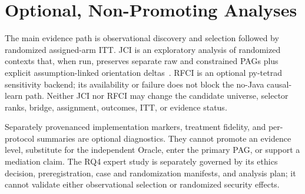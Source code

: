 \section{Optional, Non-Promoting Analyses}

The main evidence path is observational discovery and selection followed by
randomized assigned-arm ITT. JCI is an exploratory analysis of randomized contexts that, when run,
preserves separate raw and constrained PAGs plus explicit assumption-linked
orientation deltas~\cite{mooij2020jci}. RFCI is an optional py-tetrad
sensitivity backend; its availability or failure does not block the no-Java
causal-learn path. Neither JCI nor RFCI may change the candidate universe,
selector ranks, bridge, assignment, outcomes, ITT, or evidence status.

Separately provenanced implementation markers, treatment fidelity, and
per-protocol summaries are optional diagnostics. They cannot promote an
evidence level, substitute for the independent Oracle, enter the primary PAG,
or support a mediation claim. The RQ4 expert study is separately governed by
its ethics decision, preregistration, case and randomization manifests, and
analysis plan; it cannot validate either observational selection or
randomized security effects.
